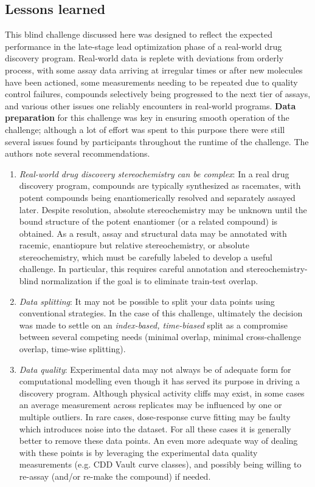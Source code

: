 \documentclass[journal=jcim,manuscript=article]{achemso}
\begin{document}
{\subsection{Lessons learned}
This blind challenge discussed here was designed to reflect the expected performance in the late-stage lead optimization phase of a real-world drug discovery program. Real-world data is replete with deviations from orderly process, with some assay data arriving at irregular times or after new molecules have been actioned, some measurements needing to be repeated due to quality control failures, compounds selectively being progressed to the next tier of assays, and various other issues one reliably encounters in real-world programs. \textbf{Data preparation} for this challenge was key in ensuring smooth operation of the challenge; although a lot of effort was spent to this purpose there were still several issues found by participants throughout the runtime of the challenge. The authors note several recommendations.
\begin{enumerate}
    \item \textit{Real-world drug discovery stereochemistry can be complex}: In a real drug discovery program, compounds are typically synthesized as racemates, with potent compounds being enantiomerically resolved and separately assayed later. Despite resolution, absolute stereochemistry may be unknown until the bound structure of the potent enantiomer (or a related compound) is obtained. As a result, assay and structural data may be annotated with racemic, enantiopure but relative stereochemistry, or absolute stereochemistry, which must be carefully labeled to develop a useful challenge. In particular, this requires careful annotation and stereochemistry-blind normalization if the goal is to eliminate train-test overlap.
    \item \textit{Data splitting}: It may not be possible to split your data points using conventional strategies. In the case of this challenge, ultimately the decision was made to settle on an \textit{index-based, time-biased} split as a compromise between several competing needs (minimal overlap, minimal cross-challenge overlap, time-wise splitting). 
    \item \textit{Data quality}: Experimental data may not always be of adequate form for computational modelling even though it has served its purpose in driving a discovery program. Although physical activity cliffs may exist, in some cases an average measurement across replicates may be influenced by one or multiple outliers. In rare cases, dose-response curve fitting may be faulty which introduces noise into the dataset. For all these cases it is generally better to remove these data points. An even more adequate way of dealing with these points is by leveraging the experimental data quality measurements (e.g. CDD Vault curve classes), and possibly being willing to re-assay (and/or re-make the compound) if needed.

\end{enumerate}}
\end{document}
